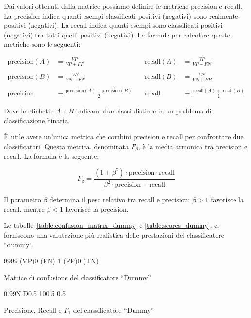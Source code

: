 Dai valori ottenuti dalla matrice possiamo definire le metriche precision e
recall. La precision indica quanti esempi classificati positivi (negativi)
sono realmente positivi (negativi). La recall indica quanti esempi sono
classificati positivi (negativi) tra tutti quelli positivi (negativi). Le
formule per calcolare queste metriche sono le seguenti:

$$\begin{aligned}
    \text{precision}(A) &= \frac{VP}{VP + FP} & \quad \text{recall}(A) &= \frac{VP}{VP + FN} \\
    \\
    \text{precision}(B) &= \frac{VN}{VN + FN} & \quad \text{recall}(B) &= \frac{VN}{VN + FP} \\
    \\
    \text{precision} &= \frac{\text{precision}(A) + \text{precision}(B)}{2} & \quad \text{recall} &= \frac{\text{recall}(A) + \text{recall}(B)}{2}
\end{aligned}$$

Dove le etichette $A$ e $B$ indicano due classi distinte in un problema di
classificazione binaria.

È utile avere un'unica metrica che combini precision e recall per confrontare
due classificatori. Questa metrica, denominata $F_\beta$, è la media armonica
tra precision e recall. La formula è la seguente:

$$F_\beta=\frac{(1+\beta^2)\cdot\text{precision}\cdot\text{recall}}{\beta^2\cdot\text{precision}+\text{recall}}$$

Il parametro $\beta$ determina il peso relativo tra recall e precision:
$\beta>1$ favorisce la recall, mentre $\beta<1$ favorisce la precision.

Le tabelle~\ref{table:confusion_matrix_dummy} e \ref{table:scores_dummy}, ci
forniscono una valutazione più realistica delle prestazioni del classificatore
``dummy''.

\begin{table}[!ht]
    \centering
    \confusionmatrix%
    {9999 (VP)}{0 (FN)}%
    {1 (FP)}{0 (TN)}
    \caption{Matrice di confusione del classificatore ``Dummy''}
    \label{table:confusion_matrix_dummy}
\end{table}

\begin{table}[!ht]
    \centering
    \scores%
    {0.99}{N.D}{0.5}%
    {1}{0}{0.5}%
    {0.5}
    \caption{Precisione, Recall e $F_1$ del classificatore ``Dummy''}
    \label{table:scores_dummy}
\end{table}

